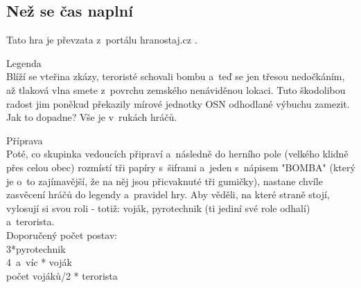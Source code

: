
\subsection{Než se čas naplní}
Tato hra je převzata z~portálu hranostaj.cz \cite{NezSeCasNaplni}.

Legenda\\
Blíží se vteřina zkázy, teroristé schovali bombu a~teď se jen třesou nedočkáním, až tlaková vlna smete z~povrchu zemského nenáviděnou lokaci. 
Tuto škodolibou radost jim poněkud překazily mírové jednotky OSN odhodlané výbuchu zamezit. 
Jak to dopadne? 
Vše je v~rukách hráčů.

Příprava\\
Poté, co skupinka vedoucích připraví a~následně do herního pole (velkého klidně přes celou obec) rozmístí tři papíry s~šiframi a~jeden s~nápisem "BOMBA" (který je o~to zajímavější, že na něj jsou přicvaknuté tři gumičky), nastane chvíle zasvěcení hráčů do legendy a~pravidel hry. 
Aby věděli, na které straně stojí, vylosují si svou roli - totiž: voják, pyrotechnik (ti jediní své role odhalí) a~terorista.\\
Doporučený počet postav:\\
3*pyrotechnik\\
4~a~víc * voják\\
počet vojáků/2 * terorista\\


